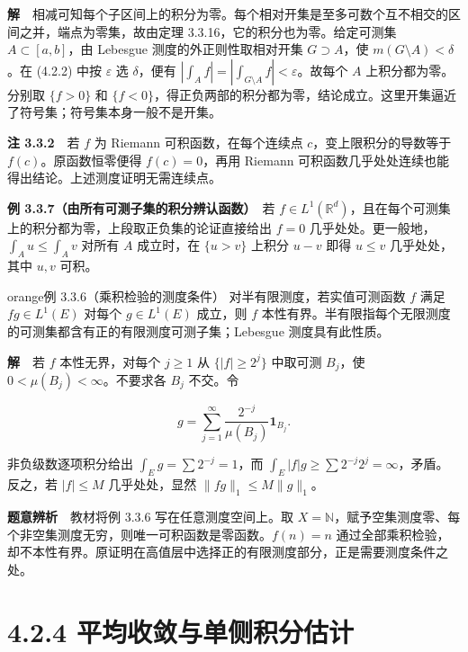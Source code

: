 \documentclass[11pt,a4paper]{article}
\begin{document}
\textbf{解}　相减可知每个子区间上的积分为零。每个相对开集是至多可数个互不相交的区间之并，端点为零集，故由定理
3.3.16，它的积分也为零。给定可测集 \(A\subset[a,b]\)，由 Lebesgue
测度的外正则性取相对开集 \(G\supset A\)，使
\(m(G\setminus A)<\delta\)。在 (4.2.2) 中按 \(\varepsilon\) 选
\(\delta\)，便有
\(|\int_A f|=|\int_{G\setminus A}f|<\varepsilon\)。故每个 \(A\)
上积分都为零。分别取 \(\{f>0\}\) 和
\(\{f<0\}\)，得正负两部的积分都为零，结论成立。这里开集逼近了符号集；符号集本身一般不是开集。

\textbf{注 3.3.2}　若 \(f\) 为 Riemann 可积函数，在每个连续点
\(c\)，变上限积分的导数等于 \(f(c)\)。原函数恒零便得 \(f(c)=0\)，再用
Riemann 可积函数几乎处处连续也能得出结论。上述测度证明无需连续点。

\textbf{例 3.3.7（由所有可测子集的积分辨认函数）}　若
\(f\in L^1(\mathbb R^d)\)，且在每个可测集上的积分都为零，上段取正负集的论证直接给出
\(f=0\) 几乎处处。更一般地，\(\int_A u\le\int_A v\) 对所有 \(A\)
成立时，在 \(\{u>v\}\) 上积分 \(u-v\) 即得 \(u\le v\) 几乎处处，其中
\(u,v\) 可积。

\begin{sboxenv}{orange}{例 3.3.6（乘积检验的测度条件）}
对半有限测度，若实值可测函数 \(f\) 满足 \(fg\in L^1(E)\) 对每个
\(g\in L^1(E)\) 成立，则 \(f\)
本性有界。半有限指每个无限测度的可测集都含有正的有限测度可测子集；Lebesgue
测度具有此性质。

\end{sboxenv}

\textbf{解}　若 \(f\) 本性无界，对每个 \(j\ge1\) 从 \(\{|f|\ge 2^j\}\)
中取可测 \(B_j\)，使 \(0<\mu(B_j)<\infty\)。不要求各 \(B_j\) 不交。令

\begin{equation*}
g=\sum_{j=1}^\infty \frac{2^{-j}}{\mu(B_j)}\mathbf1_{B_j}.
\end{equation*}

非负级数逐项积分给出 \(\int_E g=\sum 2^{-j}=1\)，而
\(\int_E|f|g\ge\sum 2^{-j}2^j=\infty\)，矛盾。反之，若 \(|f|\le M\)
几乎处处，显然 \(\|fg\|_1\le M\|g\|_1\)。

\textbf{题意辨析}　教材将例 3.3.6 写在任意测度空间上。取
\(X=\mathbb N\)，赋予空集测度零、每个非空集测度无穷，则唯一可积函数是零函数。\(f(n)=n\)
通过全部乘积检验，却不本性有界。原证明在高值层中选择正的有限测度部分，正是需要测度条件之处。

\clearpage\section[\S{}4.2.4
平均收敛与单侧积分估计]{4.2.4
平均收敛与单侧积分估计}\label{ux5e73ux5747ux6536ux655bux4e0eux5355ux4fa7ux79efux5206ux4f30ux8ba1}
\end{document}
